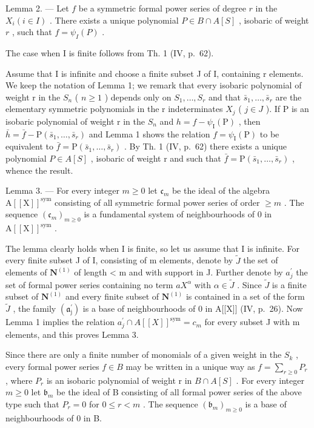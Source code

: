 Lemma 2. --- Let \(f\) be a symmetric formal power series of degree \(r\) in the \(X_i (i \in I)\) . There exists a unique polynomial \(P \in B \cap A[S]\) , isobaric of weight \(r\) , such that \(f = \psi_I(P)\) .

The case when I is finite follows from Th. 1 (IV, p.~62).

Assume that I is infinite and choose a finite subset J of I, containing r elements. We keep the notation of Lemma 1; we remark that every isobaric polynomial of weight r in the \(S_{n}\) ( \(n \geqslant 1\) ) depends only on \(S_{1}, \ldots, S_{r}\) and that \(\bar{s}_{1}, \ldots, \bar{s}_{r}\) are the elementary symmetric polynomials in the r indeterminates \(X_{j}\) ( \(j \in J\) ). If P is an isobaric polynomial of weight r in the \(S_{n}\) and \(h = f - \psi_{\mathrm{I}}(\mathrm{P})\) , then \(\bar{h} = \bar{f} - \mathrm{P}(\bar{s}_{1}, \ldots, \bar{s}_{r})\) and Lemma 1 shows the relation \(f = \psi_{\mathrm{I}}(\mathrm{P})\) to be equivalent to \(\bar{f} = \mathrm{P}(\bar{s}_{1}, \ldots, \bar{s}_{r})\) . By Th. 1 (IV, p.~62) there exists a unique polynomial \(P \in A[S]\) , isobaric of weight r and such that \(\bar{f} = \mathrm{P}(\bar{s}_{1}, \ldots, \bar{s}_{r})\) , whence the result.

Lemma 3. --- For every integer \(m \geqslant 0\) let \(\mathfrak{c}_m\) be the ideal of the algebra \(\mathrm{A}[[\mathrm{X}]]^{\mathrm{sym}}\) consisting of all symmetric formal power series of order \(\geqslant m\) . The sequence \((\mathfrak{c}_m)_{m \geqslant 0}\) is a fundamental system of neighbourhoods of 0 in \(\mathrm{A}[[\mathrm{X}]]^{\mathrm{sym}}\) .

The lemma clearly holds when I is finite, so let us assume that I is infinite. For every finite subset J of I, consisting of m elements, denote by \(\tilde{J}\) the set of elements of \(\mathbf{N}^{(1)}\) of length \textless{} m and with support in J. Further denote by \(a_{j}^{\prime}\) the set of formal power series containing no term \(aX^{\alpha}\) with \(\alpha \in \tilde{J}\) . Since \(\tilde{J}\) is a finite subset of \(\mathbf{N}^{(1)}\) and every finite subset of \(\mathbf{N}^{(1)}\) is contained in a set of the form \(\tilde{J}\) , the family \((\mathfrak{a}_{\mathrm{j}}^{\prime})\) is a base of neighbourhoods of 0 in A{[}{[}X{]}{]} (IV, p.~26). Now Lemma 1 implies the relation \(a_{j}^{\prime} \cap A[[X]]^{\text{sym}} = c_{m}\) for every subset J with m elements, and this proves Lemma 3.

Since there are only a finite number of monomials of a given weight in the \(S_{k}\) , every formal power series \(f \in B\) may be written in a unique way as \(f = \sum_{r \geqslant 0} P_{r}\) , where \(P_{r}\) is an isobaric polynomial of weight r in \(B \cap A[S]\) . For every integer \(m \geqslant 0\) let \(\mathfrak{b}_m\) be the ideal of B consisting of all formal power series of the above type such that \(P_r = 0\) for \(0 \leqslant r < m\) . The sequence \((\mathfrak{b}_m)_{m \geqslant 0}\) is a base of neighbourhoods of 0 in B.

